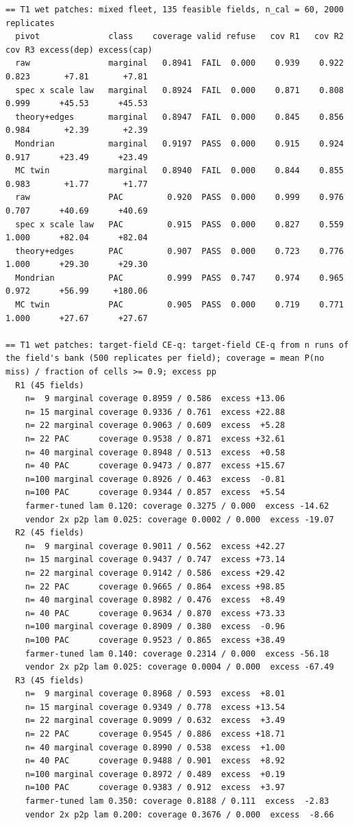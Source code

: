 \documentclass[preprint,12pt,authoryear]{elsarticle}
\begin{document}
\begin{Verbatim}[fontsize=\tiny,breaklines]
== T1 wet patches: mixed fleet, 135 feasible fields, n_cal = 60, 2000 replicates
  pivot              class    coverage valid refuse   cov R1   cov R2   cov R3 excess(dep) excess(cap)
  raw                marginal   0.8941  FAIL  0.000    0.939    0.922    0.823       +7.81       +7.81
  spec x scale law   marginal   0.8924  FAIL  0.000    0.871    0.808    0.999      +45.53      +45.53
  theory+edges       marginal   0.8947  FAIL  0.000    0.845    0.856    0.984       +2.39       +2.39
  Mondrian           marginal   0.9197  PASS  0.000    0.915    0.924    0.917      +23.49      +23.49
  MC twin            marginal   0.8940  FAIL  0.000    0.844    0.855    0.983       +1.77       +1.77
  raw                PAC         0.920  PASS  0.000    0.999    0.976    0.707      +40.69      +40.69
  spec x scale law   PAC         0.915  PASS  0.000    0.827    0.559    1.000      +82.04      +82.04
  theory+edges       PAC         0.907  PASS  0.000    0.723    0.776    1.000      +29.30      +29.30
  Mondrian           PAC         0.999  PASS  0.747    0.974    0.965    0.972      +56.99     +180.06
  MC twin            PAC         0.905  PASS  0.000    0.719    0.771    1.000      +27.67      +27.67

== T1 wet patches: target-field CE-q: target-field CE-q from n runs of the field's bank (500 replicates per field); coverage = mean P(no miss) / fraction of cells >= 0.9; excess pp
  R1 (45 fields)
    n=  9 marginal coverage 0.8959 / 0.586  excess +13.06
    n= 15 marginal coverage 0.9336 / 0.761  excess +22.88
    n= 22 marginal coverage 0.9063 / 0.609  excess  +5.28
    n= 22 PAC      coverage 0.9538 / 0.871  excess +32.61
    n= 40 marginal coverage 0.8948 / 0.513  excess  +0.58
    n= 40 PAC      coverage 0.9473 / 0.877  excess +15.67
    n=100 marginal coverage 0.8926 / 0.463  excess  -0.81
    n=100 PAC      coverage 0.9344 / 0.857  excess  +5.54
    farmer-tuned lam 0.120: coverage 0.3275 / 0.000  excess -14.62
    vendor 2x p2p lam 0.025: coverage 0.0002 / 0.000  excess -19.07
  R2 (45 fields)
    n=  9 marginal coverage 0.9011 / 0.562  excess +42.27
    n= 15 marginal coverage 0.9437 / 0.747  excess +73.14
    n= 22 marginal coverage 0.9142 / 0.586  excess +29.42
    n= 22 PAC      coverage 0.9665 / 0.864  excess +98.85
    n= 40 marginal coverage 0.8982 / 0.476  excess  +8.49
    n= 40 PAC      coverage 0.9634 / 0.870  excess +73.33
    n=100 marginal coverage 0.8909 / 0.380  excess  -0.96
    n=100 PAC      coverage 0.9523 / 0.865  excess +38.49
    farmer-tuned lam 0.140: coverage 0.2314 / 0.000  excess -56.18
    vendor 2x p2p lam 0.025: coverage 0.0004 / 0.000  excess -67.49
  R3 (45 fields)
    n=  9 marginal coverage 0.8968 / 0.593  excess  +8.01
    n= 15 marginal coverage 0.9349 / 0.778  excess +13.54
    n= 22 marginal coverage 0.9099 / 0.632  excess  +3.49
    n= 22 PAC      coverage 0.9545 / 0.886  excess +18.71
    n= 40 marginal coverage 0.8990 / 0.538  excess  +1.00
    n= 40 PAC      coverage 0.9488 / 0.901  excess  +8.92
    n=100 marginal coverage 0.8972 / 0.489  excess  +0.19
    n=100 PAC      coverage 0.9383 / 0.912  excess  +3.97
    farmer-tuned lam 0.350: coverage 0.8188 / 0.111  excess  -2.83
    vendor 2x p2p lam 0.200: coverage 0.3676 / 0.000  excess  -8.66


\end{Verbatim}
\end{document}
